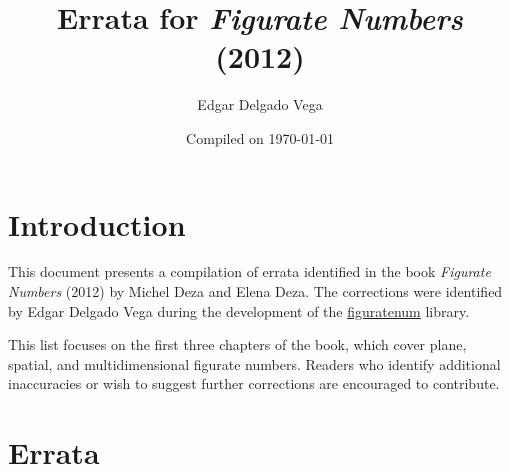 \documentclass[10pt, a4paper]{article}
\title{Errata for \emph{Figurate Numbers} (2012)}
\author{Edgar Delgado Vega}
\date{Compiled on \today}
\begin{document}
\maketitle

\section*{Introduction}

This document presents a compilation of errata identified in the book \emph{Figurate Numbers} (2012) by Michel Deza and Elena Deza. The corrections were identified by Edgar Delgado Vega during the development of the \href{https://pypi.org/project/figuratenum/}{figuratenum} library.

This list focuses on the first three chapters of the book, which cover plane, spatial, and multidimensional figurate numbers. Readers who identify additional inaccuracies or wish to suggest further corrections are encouraged to contribute.

\section*{Errata}
\end{document}

